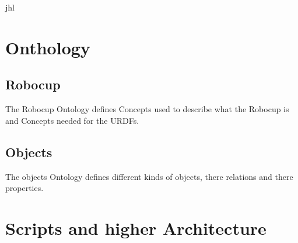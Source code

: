\documentclass[main.tex]{subfiles}
\begin{document}
jhl

\section{Onthology}
\subsection{Robocup}
	  	
	  	The Robocup Ontology defines Concepts used to describe what the Robocup is and Concepts needed for the URDFs.
	  	
	  	\subsection{Objects}
	  	
	  	The objects Ontology defines different kinds of objects, there relations and there properties. 

\section{Scripts and higher Architecture}
\chapterauthor{}	  	


	\endgroup
\end{document}
